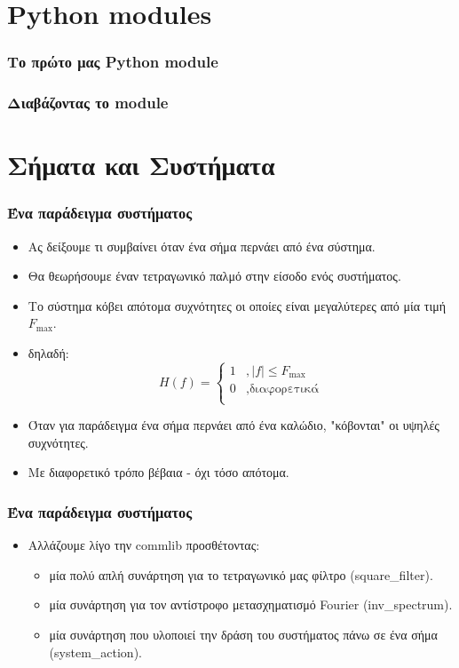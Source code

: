\documentclass[9pt]{beamer}
\begin{document}
	\section{Python modules}
	
	\begin{frame}
		\frametitle{Το πρώτο μας Python module}
		
	\end{frame}

	\begin{frame}
	\frametitle{Διαβάζοντας το module}
	
	\end{frame}
	
	\section{Σήματα και Συστήματα}
	\begin{frame}
		\frametitle{Ένα παράδειγμα συστήματος}
		\begin{itemize}
			\item Ας δείξουμε τι συμβαίνει όταν ένα σήμα περνάει από ένα σύστημα.
			\item Θα θεωρήσουμε έναν τετραγωνικό παλμό στην είσοδο ενός συστήματος.
			\item Το σύστημα κόβει απότομα συχνότητες οι οποίες είναι μεγαλύτερες από μία τιμή $F_\mathrm{max}$.
			\item δηλαδή:
			\begin{equation}
			H(f)= \left\{
			\begin{array}{ll}
			1 & ,|f| \le F_\mathrm{max} \\
			0 & ,\text{διαφορετικά}\\
			\end{array} 
			\right. 
			\end{equation}
			\item Όταν για παράδειγμα ένα σήμα περνάει από ένα καλώδιο, "κόβονται" οι υψηλές συχνότητες. 
			\item Με διαφορετικό τρόπο βέβαια - όχι τόσο απότομα.
		\end{itemize}
	\end{frame}

	\begin{frame}
	\frametitle{Ένα παράδειγμα συστήματος}
	\begin{itemize}
		\item Αλλάζουμε λίγο την commlib προσθέτοντας:
		\begin{itemize} 
			\item μία πολύ απλή συνάρτηση για το τετραγωνικό μας φίλτρο (square\_filter).
			\item μία συνάρτηση για τον αντίστροφο μετασχηματισμό Fourier (inv\_spectrum).
			\item μία συνάρτηση που υλοποιεί την δράση του συστήματος πάνω σε ένα σήμα (system\_action).	
		\end{itemize}
	\end{itemize}
	
	
	\end{frame}
\end{document}
